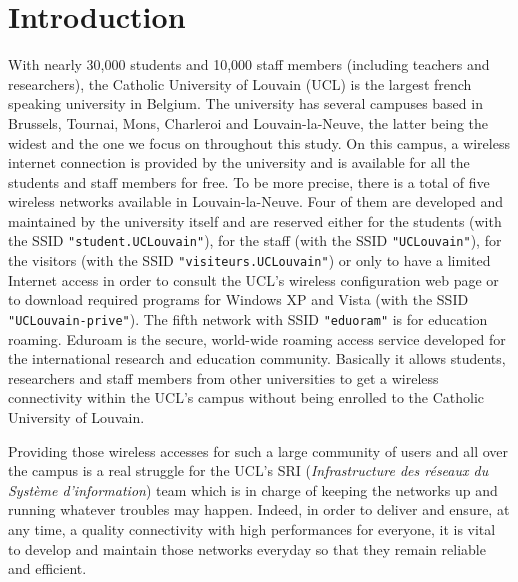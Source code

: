 
\chapter{Introduction} %

\label{Chapter1} %


With nearly 30,000 students and 10,000 staff members (including teachers and researchers), the Catholic University of Louvain (UCL) is the largest french speaking university in Belgium. The university has several campuses based in Brussels, Tournai, Mons, Charleroi and Louvain-la-Neuve, the latter being the widest and the one we focus on throughout this study. On this campus, a wireless internet connection is provided by the university and is available for all the students and staff members for free. To be more precise, there is a total of five wireless networks available in Louvain-la-Neuve. Four of them are developed and maintained by the university itself and are reserved either for the students (with the SSID \texttt{"student.UCLouvain"}), for the staff (with the SSID \texttt{"UCLouvain"}), for the visitors (with the SSID \texttt{"visiteurs.UCLouvain"}) or only to have a limited Internet access in order to consult the UCL's wireless configuration web page or to download required programs  for Windows XP and Vista (with the SSID \texttt{"UCLouvain-prive"}). The fifth network with SSID \texttt{"eduoram"} is for education roaming. Eduroam is the secure, world-wide roaming access service developed for the international research and education community\cite{eduroam1}. Basically it allows students, researchers and staff members from other universities to get a wireless connectivity within the UCL's campus without being enrolled to the Catholic University of Louvain.

Providing those wireless accesses for such a large community of users and all over the campus is a real struggle for the UCL's SRI (\textit{Infrastructure des réseaux du Système d'information}) team which is in charge of keeping the networks up and running whatever troubles may happen. Indeed, in order to deliver and ensure, at any time, a quality connectivity with high performances for everyone, it is vital to develop and maintain those networks everyday so that they remain reliable and efficient.
 
